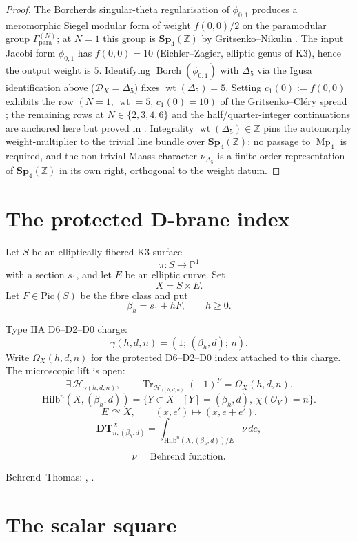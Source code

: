 \documentclass[11pt]{memoir}
\newcommand{\Z}{\mathbb{Z}} \newcommand{\C}{\mathbb{C}}
\newcommand{\Sp}{\mathbf{Sp}}
\begin{document}
\begin{proof}
The Borcherds singular-theta regularisation of $\phi_{0,1}$ produces a
meromorphic Siegel modular form of weight $f(0,0)/2$ on the paramodular
group $\Gamma^{(N)}_{\mathrm{para}}$; at $N=1$ this group is $\Sp_4(\Z)$
by Gritsenko--Nikulin \cite{GN}.  The input Jacobi form $\phi_{0,1}$
has $f(0,0)=10$ (Eichler--Zagier, elliptic genus of K3), hence the
output weight is $5$.  Identifying $\operatorname{Borch}(\phi_{0,1})$
with $\Delta_5$ via the Igusa identification above
($\mathcal D_X=\Delta_5$) fixes
$\operatorname{wt}(\Delta_5)=5$.  Setting $c_1(0):=f(0,0)$ exhibits the
row $(N=1,\,\operatorname{wt}=5,\,c_1(0)=10)$ of the Gritsenko--Cl\'ery
spread \cite{GC}; the remaining rows at $N\in\{2,3,4,6\}$ and the
half/quarter-integer continuations are anchored here but proved in
\cite{GC}.  Integrality $\operatorname{wt}(\Delta_5)\in\Z$ pins the automorphy
weight-multiplier to the trivial line bundle over $\Sp_4(\Z)$: no
passage to $\operatorname{Mp}_4$ is required, and the non-trivial
Maass character $\nu_{\Delta_5}$ is a finite-order representation of
$\Sp_4(\Z)$ in its own right, orthogonal to the weight datum.
\end{proof}

\section{The protected D-brane index}

Let $S$ be an elliptically fibered K3 surface
$$\pi:S\rightarrow \mathbb{P}^1$$
with a section $s_1$, and let $E$ be an elliptic curve.  Set
$$X=S\times E.$$
Let $F\in \mathrm{Pic}(S)$ be the fibre class and put
$$\beta_h=s_1+hF,\qquad h\geq 0.$$

Type IIA D6--D2--D0 charge:
$$\gamma(h,d,n)=(1;\,(\beta_h,d);\,n).$$
Write $\Omega_X(h,d,n)$ for the protected D6--D2--D0 index attached to
this charge.  The microscopic lift is open:
$$
\exists\,\mathcal H_{\gamma(h,d,n)},\qquad
\operatorname{Tr}_{\mathcal H_{\gamma(h,d,n)}}(-1)^F
=\Omega_X(h,d,n).
$$
$$\mathrm{Hilb}^n(X,(\beta_h,d))
=\{Y\subset X\mid [Y]=(\beta_h,d),\ \chi(\mathcal O_Y)=n\}.$$
$$E\curvearrowright X,\qquad (x,e')\mapsto (x,e+e').$$
$$\mathbf{DT}^X_{n,(\beta_h,d)}
=\int_{\mathrm{Hilb}^n(X,(\beta_h,d))/E}\nu\,de,$$
$$\nu=\hbox{Behrend function}.$$
Behrend--Thomas: \cite{BEHREND}, \cite{DT}.

\section{The scalar square}
\end{document}
